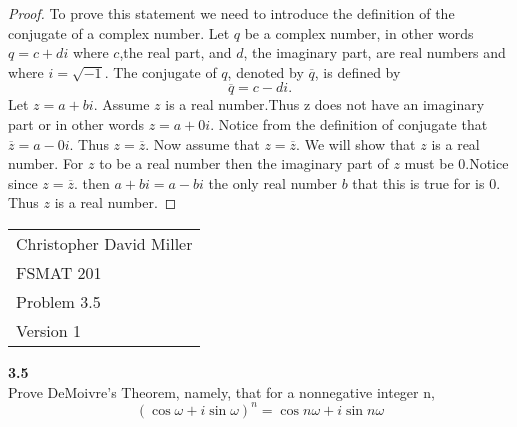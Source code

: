 \documentclass[12pt]{article}
\begin{document}
        \begin{proof}
          To prove this statement we need to introduce the definition of the conjugate of a complex number. Let $q$ be a complex number, in other words $q = c + di$ where $c$,the real part, and $d$, the imaginary part, are real numbers and where $i = \sqrt{-1}.$ The conjugate of $q$, denoted by $\overline{q}$, is defined by $$\overline{q}= c - di.$$
          Let $z = a + bi$. Assume $z$ is a real number.Thus z does not have an imaginary part or in other words $z = a +0i$. Notice from the definition of conjugate that $\overline{z} = a-0i$. Thus $z = \overline{z}$. Now assume that $z = \overline{
            z
          }.$ We will show that $z$ is a real number. For $z$ to be a real number then the imaginary part of $z$ must be 0.Notice since 
          $z = \overline{
            z
          }.$ then $a+bi = a - bi$ the only real number $b$ that this is true for is 0. Thus $z$ is a real number.  
        \end{proof}   
  
      
        \newpage
      \begin{flushright}
        \begin{tabular}{l}
        Christopher David Miller \\  %
        FSMAT 201 \\  %
        Problem 3.5 \\  %
        Version 1 \\ %
        \end{tabular}
        \end{flushright}
        \vspace{20pt}  %
        
        
        \textbf{3.5} \\  %
         Prove DeMoivre's Theorem, namely, that for a nonnegative integer n, $$ (\cos\omega + i\sin\omega)^n = \cos n\omega+i\sin n\omega $$
        
\end{document}
